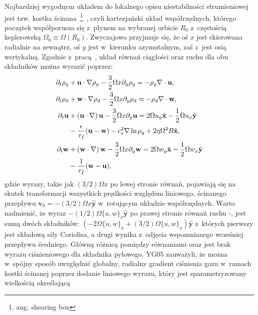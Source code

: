 Najbardziej wygodnym układem do lokalnego opisu niestabilności strumieniowej
jest tzw. kostka ścinana~\footnote{ang. shearing box}~\citep{HGB95}, czyli
kartezjański układ współrzędnych, którego początek współporusza się z~płynem na
wybranej orbicie $R_0$ z~częstością keplerowską $\Omega_0 \equiv
\Omega\left(R_0\right)$. Zwyczajowo przyjmuje się, że oś $x$ jest skierowana
radialnie na zewnątrz, oś $y$ jest w~kierunku azymutalnym, zaś $z$~jest osią
wertykalną. Zgodnie z~pracą~\cite*{YJ07}, układ równań ciągłości oraz ruchu dla
obu składników można wyrazić poprzez:
%
\begin{align}
\partial_t \rho_g &+ \mathbf{u}\cdot\nabla\rho_g - \frac{3}{2}\Omega x\partial_y\rho_g 
 = -\rho_g\nabla\cdot\mathbf{u},\label{eqc1}\\
\partial_t \rho_d &+ \mathbf{w}\cdot\nabla\rho_d - \frac{3}{2}\Omega x\partial_y\rho_d 
 = -\rho_d\nabla\cdot\mathbf{w},\label{eqc2}\\
\partial_t \mathbf{u} &+ \left(\mathbf{u}\cdot\nabla\right)\mathbf{u} 
 - \frac{3}{2}\Omega x\partial_y\mathbf{u} 
 = 2\Omega u_y \hat{\mathbf{x}} -\frac{1}{2}\Omega u_x \hat{\mathbf{y}} \notag\\
 &- \frac{\epsilon}{\tau_f}(\mathbf{u}-\mathbf{w}) -c_s^2\nabla\ln\rho_g 
 +2\eta\Omega^2 R \hat{\mathbf{x}},\label{eqm1}\\
\partial_t \mathbf{w} &+ \left(\mathbf{w}\cdot\nabla\right)\mathbf{w} 
 - \frac{3}{2}\Omega x\partial_y\mathbf{w}
 = 2\Omega w_y \hat{\mathbf{x}} -\frac{1}{2}\Omega w_x \hat{\mathbf{y}} \notag\\
 &- \frac{1}{\tau_f}(\mathbf{w}-\mathbf{u}), \label{eqm2}
\end{align}
%
gdzie wyrazy, takie jak $(3/2)\Omega x$ po lewej stronie równań, pojawiają się na
skutek transformacji wszystkich prędkości względem liniowego, ścinanego przepływu
$\mathbf{v}_0 = -(3/2)\Omega x \hat{\mathbf{y}}$ w~rotującym układzie
współrzędnych. Warto nadmienić, że wyraz $-(1/2)\Omega \{u,w\}_x
\hat{\mathbf{y}}$ po prawej stronie równań ruchu -, jest
sumą dwóch składników: $(-2\Omega \{u,w\}_x + (3/2)\Omega \{u,w\}_x)
\hat{\mathbf{y}}$ z~których pierwszy jest składową siły Coriolisa, a drugi
wynika z~odjęcia wspomnianego wcześniej przepływu średniego. Główną różnicą
pomiędzy równaniami  oraz  jest brak wyrazu ciśnieniowego
dla składnika pyłowego. YG05 zauważyli, że można w~spójny sposób uwzględnić
globalny, radialny gradient ciśnienia gazu w~ramach kostki ścinanej poprzez
dodanie liniowego wyrazu, który jest sparametryzowany wielkością określającą
